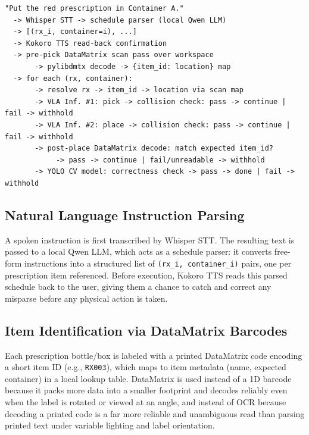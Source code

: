 \documentclass[12pt,a4paper]{article}
\begin{document}
\begin{verbatim}
"Put the red prescription in Container A."
  -> Whisper STT -> schedule parser (local Qwen LLM)
  -> [(rx_i, container=i), ...]
  -> Kokoro TTS read-back confirmation
  -> pre-pick DataMatrix scan pass over workspace
       -> pylibdmtx decode -> {item_id: location} map
  -> for each (rx, container):
       -> resolve rx -> item_id -> location via scan map
       -> VLA Inf. #1: pick -> collision check: pass -> continue | fail -> withhold
       -> VLA Inf. #2: place -> collision check: pass -> continue | fail -> withhold
       -> post-place DataMatrix decode: match expected item_id?
            -> pass -> continue | fail/unreadable -> withhold
       -> YOLO CV model: correctness check -> pass -> done | fail -> withhold
\end{verbatim}
 
\subsection{Natural Language Instruction Parsing}
 
A spoken instruction is first transcribed by Whisper STT. The resulting text is passed to a local Qwen LLM, which acts as a schedule parser: it converts free-form instructions into a structured list of \texttt{(rx\_i, container\_i)} pairs, one per prescription item referenced. Before execution, Kokoro TTS reads this parsed schedule back to the user, giving them a chance to catch and correct any misparse before any physical action is taken.
 
\subsection{Item Identification via DataMatrix Barcodes}
 
Each prescription bottle/box is labeled with a printed DataMatrix code encoding a short item ID (e.g., \texttt{RX003}), which maps to item metadata (name, expected container) in a local lookup table. DataMatrix is used instead of a 1D barcode because it packs more data into a smaller footprint and decodes reliably even when the label is rotated or viewed at an angle, and instead of OCR because decoding a printed code is a far more reliable and unambiguous read than parsing printed text under variable lighting and label orientation.
 
\end{document}
